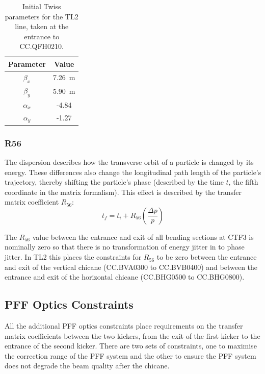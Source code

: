 \begin{table}
  \begin{center}
    \begin{tabular}{|c c|}
	   \hline
       Parameter & Value \\
       \hline
       \(\beta_x\) & 7.26~m\\
	   \(\beta_y\) & 5.90~m\\
	   \(\alpha_x\) & -4.84\\
	   \(\alpha_y\) & -1.27\\
	   \hline
    \end{tabular}
    \caption{Initial Twiss parameters for the TL2 line, taken at the entrance to CC.QFH0210.}
  	\label{t:tl2InitTwiss}
  \end{center}
\end{table}

\subsubsection{R56}

The dispersion describes how the transverse orbit of a particle is changed by its energy. These differences also change the longitudinal path length of the particle's trajectory, thereby shifting the particle's phase (described by the time \(t\), the fifth coordinate in the matrix formalism). This effect is described by the transfer matrix coefficient \(R_{56}\):
\begin{equation}
t_{f} = t_{i} + R_{56}\left(\frac{\Delta p}{p}\right)
\end{equation}

The \(R_{56}\) value between the entrance and exit of all bending sections at CTF3 is nominally zero so that there is no transformation of energy jitter in to phase jitter. In TL2 this places the constraints for \(R_{56}\) to be zero between the entrance and exit of the vertical chicane (CC.BVA0300 to CC.BVB0400) and between the entrance and exit of the horizontal chicane (CC.BHG0500 to CC.BHG0800).

\subsection{PFF Optics Constraints}
\label{ss:pffOpticsReqs}

All the additional PFF optics constraints place requirements on the transfer matrix coefficients between the two kickers, from the exit of the first kicker to the entrance of the second kicker. There are two sets of constraints, one to maximise the correction range of the PFF system and the other to ensure the PFF system does not degrade the beam quality after the chicane.

